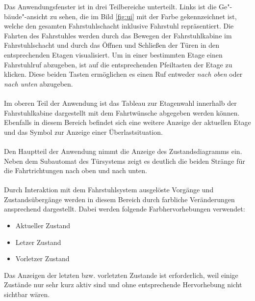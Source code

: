 Das Anwendungsfenster ist in drei Teilbereiche unterteilt. Links ist die Ge"-bäude"-ansicht zu sehen, die im Bild \ref{fig:ui} mit der Farbe  gekennzeichnet ist, welche den gesamten Fahrstuhlschacht inklusive Fahrstuhl repräsentiert. Die Fahrten des Fahrstuhles werden durch das Bewegen der Fahrstuhlkabine im Fahrstuhlschacht und durch das Öffnen und Schließen der Türen in den entsprechenden Etagen visualisiert. Um in einer bestimmten Etage einen Fahrstuhlruf abzugeben, ist auf die entsprechenden Pfeiltasten der Etage zu klicken. Diese beiden Tasten ermöglichen es einen Ruf entweder \textit{nach oben} oder \textit{nach unten} abzugeben.

\paragraph{}Im oberen Teil der Anwendung  ist das Tableau zur Etagenwahl innerhalb der Fahrstuhlkabine dargestellt mit dem Fahrtwünsche abgegeben werden können. Ebenfalls in diesem Bereich befindet sich eine weitere Anzeige der aktuellen Etage und das Symbol zur Anzeige einer Überlastsituation.

\paragraph{}Den Hauptteil der Anwendung  nimmt die Anzeige des Zustandsdiagramms ein. Neben dem Subautomat des Türsystems zeigt es deutlich die beiden Stränge für die Fahrtrichtungen nach oben und nach unten.

\paragraph{}Durch Interaktion mit dem Fahrstuhlsystem ausgelöste Vorgänge und Zustandsübergänge werden in diesem Bereich durch farbliche Veränderungen ansprechend dargestellt. Dabei werden folgende Farbhervorhebungen verwendet: 
\begin{itemize}
 \item {} Aktueller Zustand
 \item {} Letzer Zustand
 \item {} Vorletzer Zustand
\end{itemize}
Das Anzeigen der letzten bzw. vorletzten Zustande ist erforderlich, weil einige Zustände nur sehr kurz aktiv sind und ohne entsprechende Hervorhebung nicht sichtbar wären.